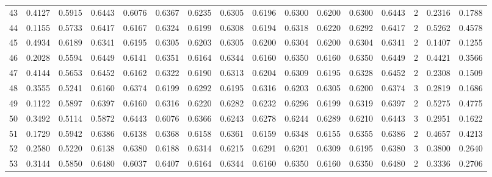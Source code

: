 \begin{tabular}{lrrrrrrrrrrrrrrr}
43  &      0.4127 &  0.5915 &  0.6443 &  0.6076 &  0.6367 &  0.6235 &  0.6305 &  0.6196 &  0.6300 &  0.6200 &   0.6300 &     0.6443 &      2 &                    0.2316 &                     0.1788 \\
44  &      0.1155 &  0.5733 &  0.6417 &  0.6167 &  0.6324 &  0.6199 &  0.6308 &  0.6194 &  0.6318 &  0.6220 &   0.6292 &     0.6417 &      2 &                    0.5262 &                     0.4578 \\
45  &      0.4934 &  0.6189 &  0.6341 &  0.6195 &  0.6305 &  0.6203 &  0.6305 &  0.6200 &  0.6304 &  0.6200 &   0.6304 &     0.6341 &      2 &                    0.1407 &                     0.1255 \\
46  &      0.2028 &  0.5594 &  0.6449 &  0.6141 &  0.6351 &  0.6164 &  0.6344 &  0.6160 &  0.6350 &  0.6160 &   0.6350 &     0.6449 &      2 &                    0.4421 &                     0.3566 \\
47  &      0.4144 &  0.5653 &  0.6452 &  0.6162 &  0.6322 &  0.6190 &  0.6313 &  0.6204 &  0.6309 &  0.6195 &   0.6328 &     0.6452 &      2 &                    0.2308 &                     0.1509 \\
48  &      0.3555 &  0.5241 &  0.6160 &  0.6374 &  0.6199 &  0.6292 &  0.6195 &  0.6316 &  0.6203 &  0.6305 &   0.6200 &     0.6374 &      3 &                    0.2819 &                     0.1686 \\
49  &      0.1122 &  0.5897 &  0.6397 &  0.6160 &  0.6316 &  0.6220 &  0.6282 &  0.6232 &  0.6296 &  0.6199 &   0.6319 &     0.6397 &      2 &                    0.5275 &                     0.4775 \\
50  &      0.3492 &  0.5114 &  0.5872 &  0.6443 &  0.6076 &  0.6366 &  0.6243 &  0.6278 &  0.6244 &  0.6289 &   0.6210 &     0.6443 &      3 &                    0.2951 &                     0.1622 \\
51  &      0.1729 &  0.5942 &  0.6386 &  0.6138 &  0.6368 &  0.6158 &  0.6361 &  0.6159 &  0.6348 &  0.6155 &   0.6355 &     0.6386 &      2 &                    0.4657 &                     0.4213 \\
52  &      0.2580 &  0.5220 &  0.6138 &  0.6380 &  0.6188 &  0.6314 &  0.6215 &  0.6291 &  0.6201 &  0.6309 &   0.6195 &     0.6380 &      3 &                    0.3800 &                     0.2640 \\
53  &      0.3144 &  0.5850 &  0.6480 &  0.6037 &  0.6407 &  0.6164 &  0.6344 &  0.6160 &  0.6350 &  0.6160 &   0.6350 &     0.6480 &      2 &                    0.3336 &                     0.2706 \\

\end{tabular}
